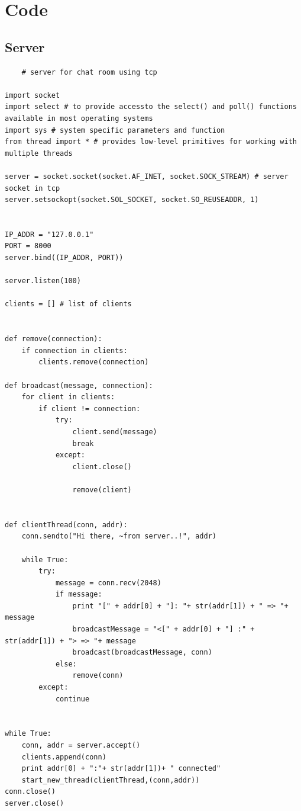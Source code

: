 \documentclass[a4paper,12pt]{article}
\begin{document}
\section{Code}
\subsection{Server}
\begin{verbatim}
    # server for chat room using tcp

import socket 
import select # to provide accessto the select() and poll() functions available in most operating systems
import sys # system specific parameters and function
from thread import * # provides low-level primitives for working with multiple threads

server = socket.socket(socket.AF_INET, socket.SOCK_STREAM) # server socket in tcp
server.setsockopt(socket.SOL_SOCKET, socket.SO_REUSEADDR, 1) 


IP_ADDR = "127.0.0.1"
PORT = 8000 
server.bind((IP_ADDR, PORT))

server.listen(100)

clients = [] # list of clients


def remove(connection):
    if connection in clients:
        clients.remove(connection)

def broadcast(message, connection):
    for client in clients:
        if client != connection:
            try:
                client.send(message)
                break
            except:
                client.close()
                
                remove(client)


def clientThread(conn, addr):
    conn.sendto("Hi there, ~from server..!", addr)

    while True:
        try:
            message = conn.recv(2048)
            if message:
                print "[" + addr[0] + "]: "+ str(addr[1]) + " => "+ message
                broadcastMessage = "<[" + addr[0] + "] :" + str(addr[1]) + "> => "+ message
                broadcast(broadcastMessage, conn)
            else: 
                remove(conn)
        except: 
            continue


while True:
    conn, addr = server.accept()
    clients.append(conn)
    print addr[0] + ":"+ str(addr[1])+ " connected"
    start_new_thread(clientThread,(conn,addr)) 
conn.close()
server.close()                               

\end{verbatim}
\end{document}
